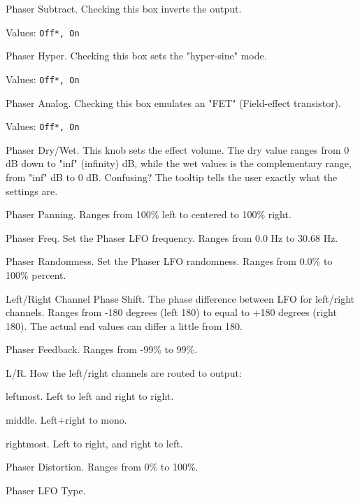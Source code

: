    Phaser Subtract.
   Checking this box inverts the output.

   Values: \texttt{Off*, On}

   Phaser Hyper.
   Checking this box sets the "hyper-sine" mode.

   Values: \texttt{Off*, On}

   Phaser Analog.
   Checking this box emulates an "FET"  (Field-effect transistor).

   Values: \texttt{Off*, On}

   Phaser Dry/Wet.
   This knob sets the effect volume.  The dry value ranges from 0 dB down to
   "inf" (infinity) dB, while the wet values is the complementary range, from
   "inf" dB to 0 dB.  Confusing?  The tooltip tells the user exactly what the
   settings are.

   Phaser Panning.
   Ranges from 100\% left to centered to 100\% right.

   Phaser Freq.
   Set the Phaser LFO frequency.
   Ranges from 0.0 Hz to 30.68 Hz.

   Phaser Randomness.
   Set the Phaser LFO randomness.
   Ranges from 0.0\% to 100\% percent.

   Left/Right Channel Phase Shift.
   The phase difference between LFO for left/right channels.
   Ranges from -180 degrees (left 180) to equal to +180 degrees (right 180).
   The actual end values can differ a little from 180.

   Phaser Feedback.
   Ranges from -99\% to 99\%.

   L/R. How the left/right channels are routed to output:

      \begin{enumber}
         \item leftmost. Left to left and right to right.
         \item middle. Left+right to mono.
         \item rightmost. Left to right, and right to left.
      \end{enumber}

   Phaser Distortion.
   Ranges from 0\% to 100\%.

   Phaser LFO Type.

